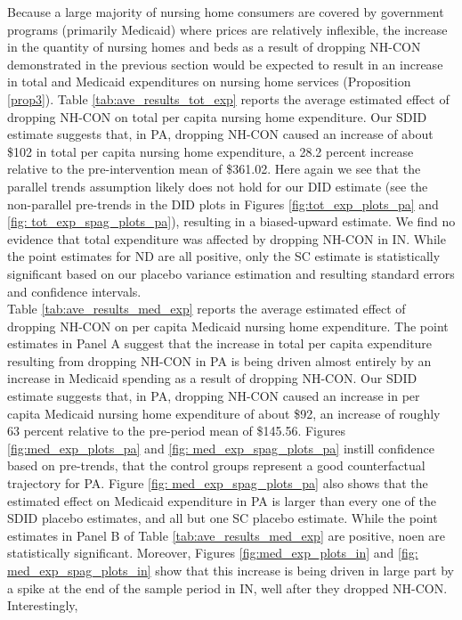 \documentclass[../Main.tex]{subfiles}
\begin{document}
Because a large majority of nursing home consumers are covered by government programs (primarily Medicaid) where prices are relatively inflexible, the increase in the quantity of nursing homes and beds  as a result of dropping NH-CON demonstrated in the previous section would be expected to result in an increase in total and Medicaid expenditures on nursing home services (Proposition \ref{prop3}). Table \ref{tab:ave_results_tot_exp} reports the average estimated effect of dropping NH-CON on total per capita nursing home expenditure. Our SDID estimate suggests that, in PA, dropping NH-CON caused an increase of about \$102 in total per capita nursing home expenditure, a 28.2 percent increase relative to the pre-intervention mean of \$361.02. Here again we see that the parallel trends assumption likely does not hold for our DID estimate (see the non-parallel pre-trends in the DID plots in Figures \ref{fig:tot_exp_plots_pa} and \ref{fig: tot_exp_spag_plots_pa}), resulting in a biased-upward estimate. We find no evidence that total expenditure was affected by dropping NH-CON in IN. While the point estimates for ND are all positive, only the SC estimate is statistically significant based on our placebo variance estimation and resulting standard errors and confidence intervals.\\
\indent Table \ref{tab:ave_results_med_exp} reports the average estimated effect of dropping NH-CON on per capita Medicaid nursing home expenditure. The point estimates in Panel A suggest that the increase in total per capita expenditure resulting from dropping NH-CON in PA is being driven almost entirely by an increase in Medicaid spending as a result of dropping NH-CON. Our SDID estimate suggests that, in PA, dropping NH-CON caused an increase in per capita Medicaid nursing home expenditure of about \$92, an increase of roughly 63 percent relative to the pre-period mean of \$145.56. Figures \ref{fig:med_exp_plots_pa} and \ref{fig: med_exp_spag_plots_pa} instill confidence based on pre-trends, that the control groups represent a good counterfactual trajectory for PA. Figure \ref{fig: med_exp_spag_plots_pa} also shows that the estimated effect on Medicaid expenditure in PA is larger than every one of the SDID placebo estimates, and all but one SC placebo estimate. While the point estimates in Panel B of Table \ref{tab:ave_results_med_exp} are positive, noen are statistically significant. Moreover, Figures \ref{fig:med_exp_plots_in} and \ref{fig: med_exp_spag_plots_in} show that this increase is being driven in large part by a spike at the end of the sample period in IN, well after they dropped NH-CON. Interestingly, 
\end{document}
